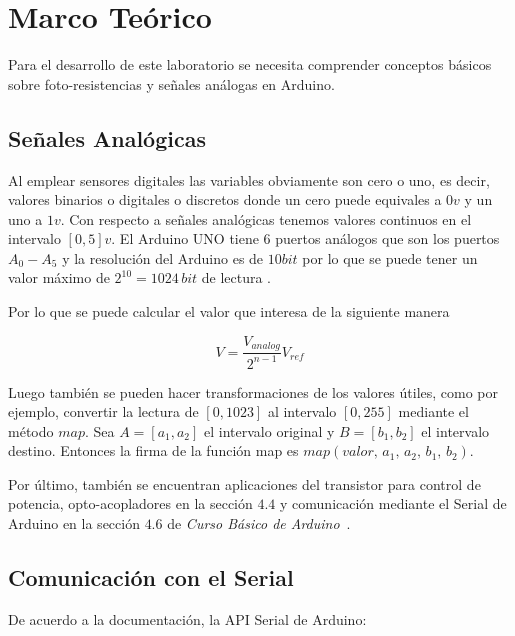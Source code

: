 \documentclass{article}
\begin{document}
    \section{Marco Teórico}\label{sec:marco-teórico}

    Para el desarrollo de este laboratorio se necesita comprender conceptos
    básicos sobre foto-resistencias y señales análogas en Arduino.

    \subsection{Señales Analógicas}\label{subsec:señales-analógicas}

    Al emplear sensores digitales las variables obviamente son cero o uno, es
    decir, valores binarios o digitales o discretos donde un cero puede
    equivales a $0v$ y un uno a $1v$. Con respecto a señales analógicas
    tenemos valores continuos en el intervalo $[0, 5]v$. El Arduino UNO tiene
    6 puertos análogos que son los puertos $A_0 - A_5$ y la resolución del
    Arduino es de $10 bit$ por lo que se puede tener un valor máximo de
    $2^{10} = 1024 \, bit$ de lectura \cite{flores-2018}.

    \bigbreak

    Por lo que se puede calcular el valor que interesa de la siguiente manera

    $$
    V = \frac{V_{analog}}{2^{n-1}} V_{ref}
    $$

    Luego también se pueden hacer transformaciones de los valores útiles,
    como por ejemplo, convertir la lectura de $[0, 1023]$ al intervalo $[0,
    255]$ mediante el método $map$. Sea $A = [a_1, a_2]$ el intervalo
    original y $B = [b_1, b_2]$ el intervalo destino. Entonces la firma de la
    función map es $map(valor, \, a_1, \, a_2, \, b_1, \, b_2)$.

    \bigbreak

    Por último, también se encuentran aplicaciones del transistor para
    control de potencia, opto-acopladores en la sección $4.4$ y comunicación
    mediante el Serial de Arduino en la sección $4.6$ de \textit{Curso Básico
    de Arduino}~\cite{flores-2018}.

    \subsection{Comunicación con el Serial}\label{subsec:comunicación-con-el
    -serial}

    De acuerdo a la documentación, la API Serial de Arduino:
\end{document}

